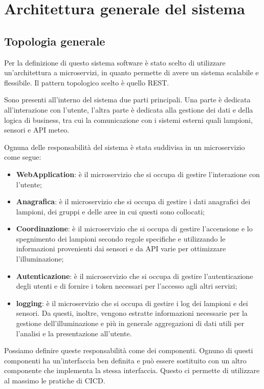 \chapter{Architettura generale del sistema} \label{cap:architettura-generale}

\section{Topologia generale} \label{sec:topologia_generale}

Per la definizione di questo sistema software è stato scelto di utilizzare un'architettura a microservizi, in quanto permette di avere un sistema scalabile e flessibile. Il pattern topologico scelto è quello REST.

Sono presenti all'interno del sistema due parti principali. Una parte è dedicata all'interazione con l'utente, l'altra parte è dedicata alla gestione dei dati e della logica di business, tra cui la comunicazione con i sistemi esterni quali lampioni, sensori e API meteo.

Ognuna delle responsabilità del sistema è stata suddivisa in un microservizio come segue:

\begin{itemize}
    \item \textbf{WebApplication}: è il microservizio che si occupa di gestire l'interazione con l'utente;
    \item \textbf{Anagrafica}: è il microservizio che si occupa di gestire i dati anagrafici dei lampioni, dei gruppi e delle aree in cui questi sono collocati;
    \item \textbf{Coordinazione}: è il microservizio che si occupa di gestire l'accensione e lo spegnimento dei lampioni secondo regole specifiche e utilizzando le informazioni provenienti dai sensori e da API varie per ottimizzare l'illuminazione;
    \item \textbf{Autenticazione}: è il microservizio che si occupa di gestire l'autenticazione degli utenti e di fornire i token necessari per l'accesso agli altri servizi;
    \item \textbf{logging}: è il microservizio che si occupa di gestire i log dei lampioni e dei sensori. Da questi, inoltre, vengono estratte informazioni necessarie per la gestione dell'illuminazione e più in generale aggregazioni di dati utili per l'analisi e la presentazione all'utente.
\end{itemize}

Possiamo definire queste responsabilità come dei componenti. Ognuno di questi componenti ha un'interfaccia ben definita e può essere sostituito con un altro componente che implementa la stessa interfaccia. Questo ci permette di utilizzare al massimo le pratiche di CICD.

